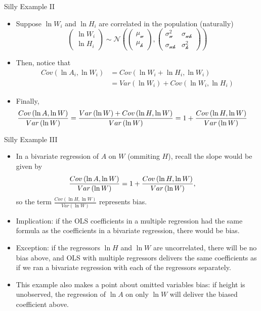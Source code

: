 \documentclass[aspectratio=169,11pt]{beamer}
\begin{document}
\begin{frame}{Silly Example II}
	\begin{itemize}
	\item Suppose $\ln W_i$ and $\ln H_i$ are correlated in the population (naturally)\[
\left(\begin{array}{c}
\ln W_{i}\\
\ln H_{i}
\end{array}\right)\sim\mathcal{N\left(\left(\begin{array}{c}
\mu_w\\
\mu_h
\end{array}\right),\left(\begin{array}{cc}
\sigma_{w}^{2} & \sigma_{wh}\\
\sigma_{wh} & \sigma_{h}^{2}
\end{array}\right)\right)}
\]
	\smallskip
	\item Then, notice that\[
	\begin{array}{ll}
	Cov\left( \ln A_{i}, \ln W_{i}\right) & = Cov\left(\ln W_{i} + \ln H_{i}, \ln W_{i}\right) \\
	& = Var\left( \ln W_{i}\right) + Cov\left(\ln W_{i}, \ln H_{i}\right) 
	\end{array}
	\]

	\smallskip
	\item Finally, \[
\hspace*{-.5cm}\frac{Cov\left(\ln A,\ln W\right)}{Var\left(\ln W\right)}=\frac{Var\left(\ln W\right)+Cov\left(\ln H,\ln W\right)}{Var\left(\ln W\right)}=1+\frac{Cov\left(\ln H,\ln W\right)}{Var\left(\ln W\right)}
\]
\end{itemize}
\end{frame}


\begin{frame}{Silly Example III}
	\begin{itemize}
	\item In a bivariate regression of $A$ on $W$ (ommiting $H$), recall the slope would be given by \[
	\hspace*{-.5cm}\frac{Cov\left(\ln A,\ln W\right)}{Var\left(\ln W\right)}=1+\frac{Cov\left(\ln H,\ln W\right)}{Var\left(\ln W\right)},
	\]
	so the term $\frac{Cov\left(\ln H,\ln W\right)}{Var\left(\ln W\right)}$ represents bias. 

	\smallskip
	\item Implication: if the OLS coefficients in a multiple regression had the same formula 
	as the coefficients in a bivariate regression, there would be bias. 

	\smallskip
	\item Exception: if the regressors $\ln H$ and $\ln W$ are uncorrelated, there will be no bias above, and
	OLS with multiple regressors delivers the same coefficients as if we ran a bivariate regression with each
	of the regressors separately. 

	\smallskip
	\item This example also makes a point about omitted variables bias: if height is unobserved, the regression
	of $\ln A$ on only $\ln W$ will deliver the biased coefficient above.

\end{itemize}
\end{frame}
\end{document}
